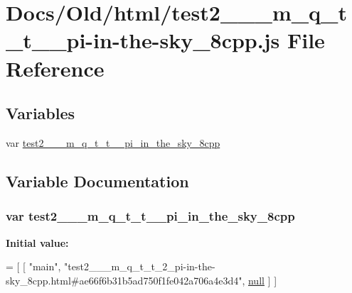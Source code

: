 \hypertarget{test2______m__q__t__t__2__pi-in-the-sky__8cpp_8js}{}\section{Docs/\+Old/html/test2\+\_\+\+\_\+\+\_\+m\+\_\+q\+\_\+t\+\_\+t\+\_\+\_\+pi-\/in-\/the-\/sky\+\_\+8cpp.js File Reference}
\label{test2______m__q__t__t__2__pi-in-the-sky__8cpp_8js}
\subsection*{Variables}
\begin{DoxyCompactItemize}
\item 
var \hyperlink{test2______m__q__t__t__2__pi-in-the-sky__8cpp_8js_a906775e6f04023f1eec2914919a98570}{test2\+\_\+\+\_\+\+\_\+m\+\_\+q\+\_\+t\+\_\+t\+\_\+\_\+pi\+\_\+in\+\_\+the\+\_\+sky\+\_\+8cpp}
\end{DoxyCompactItemize}


\subsection{Variable Documentation}
\subsubsection[{\texorpdfstring{test2\+\_\+\+\_\+\+\_\+m\+\_\+q\+\_\+t\+\_\+t\+\_\+2\+\_\+pi\+\_\+in\+\_\+the\+\_\+sky\+\_\+8cpp}{test2___m_q_t_t_2_pi_in_the_sky_8cpp}}]{\setlength{\rightskip}{0pt plus 5cm}var test2\+\_\+\+\_\+\+\_\+m\+\_\+q\+\_\+t\+\_\+t\+\_\+\_\+pi\+\_\+in\+\_\+the\+\_\+sky\+\_\+8cpp}\hypertarget{test2______m__q__t__t__2__pi-in-the-sky__8cpp_8js_a906775e6f04023f1eec2914919a98570}{}\label{test2______m__q__t__t__2__pi-in-the-sky__8cpp_8js_a906775e6f04023f1eec2914919a98570}
{\bfseries Initial value\+:}
\begin{DoxyCode}
=
[
    [ \textcolor{stringliteral}{"main"}, \textcolor{stringliteral}{"test2\_\_\_m\_q\_t\_t\_2\_pi-in-the-sky\_8cpp.html#ae66f6b31b5ad750f1fe042a706a4e3d4"}, 
      \hyperlink{namespacenlohmann_1_1detail_a1ed8fc6239da25abcaf681d30ace4985a37a6259cc0c1dae299a7866489dff0bd}{null} ]
]
\end{DoxyCode}
